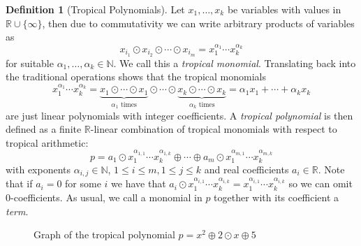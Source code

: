 \documentclass[
  paper=a4,
  titlepage,
  bibliography=totoc,
  listof=totoc,
  pagesize=pdftex
]{scrartcl}
\numberwithin{figure}{section}
\numberwithin{equation}{section}
\numberwithin{table}{section}
\newcommand*\setR{\mathds{R}}
\newcommand*\setN{\mathds{N}}
\theoremstyle{definition}
\newtheorem{definition}{Definition}
\numberwithin{definition}{section}
\begin{document}
\begin{definition}[Tropical Polynomials]
  \label{def:tropPoly}
  Let $x_1, \dots, x_k$ be variables with values in $\setR\cup\{\infty\}$, then due to
  commutativity we can write arbitrary products of variables as
  \[
    x_{i_1} \odot x_{i_2} \odot \cdots \odot x_{i_m}
    = x_1^{\alpha_1} \cdots x_k^{\alpha_k}
  \]
  for suitable $\alpha_1, \dots, \alpha_k \in \setN$. We call this a \emph{tropical
  monomial}. Translating back into the traditional operations shows that the tropical
  monomials
  \[
    x_1^{\alpha_1} \cdots x_k^{\alpha_k} =
    \underbrace{x_1\odot\cdots\odot x_1}_{\alpha_1 \text{ times}}
    \odot\cdots\odot
    \underbrace{x_k\odot\cdots\odot x_k}_{\alpha_k \text{ times}}
    = \alpha_1x_1 + \cdots + \alpha_kx_k
  \]
  are just linear polynomials with integer coefficients. A \emph{tropical polynomial} is
  then defined as a finite $\setR$-linear combination of tropical monomials with respect
  to tropical arithmetic:
  \[
    p = a_1 \odot x_1^{\alpha_{1,1}}\cdots x_k^{\alpha_{1,k}} \oplus \cdots \oplus
    a_m \odot x_1^{\alpha_{m,1}}\cdots x_k^{\alpha_{m,k}}
  \]
  with exponents $\alpha_{i,j} \in \setN$, $1\leq i \leq m, 1\leq j \leq k$ and real
  coefficients $a_i \in \setR$. Note that if $a_i = 0$ for some $i$ we have that $a_i\odot
  x_1^{\alpha_{i,1}}\cdots x_k^{\alpha_{i,k}} = x_1^{\alpha_{i,1}}\cdots
  x_k^{\alpha_{i,k}}$ so we can omit $0$-coefficients. As usual, we call a monomial in $p$
  together with its coefficient a \emph{term}.
\end{definition}

\begin{figure}[tbh]
  \centering
  \caption{Graph of the tropical polynomial $p=x^2\oplus 2\odot x \oplus 5$}
  \label{fig:tropPolyPlot}
\end{figure}
\end{document}
